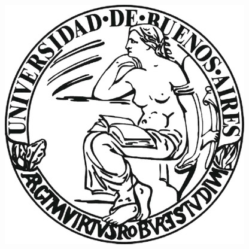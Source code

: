 \documentclass[a4paper]{article}
\begin{document}


\def\Materia{Métodos numéricos}
\def\Titulo{\LARGE Trabajo Práctico 3: OCR + SVD}
\def\Grupo{ (borrame) }

\def\Fecha{21 de junio de 2013}


\thispagestyle{empty}

\begin{center}
	\includegraphics[scale = 0.25]{imagenes/logo_uba.jpg}
\end{center}

\vspace{5mm}
\end{document}
